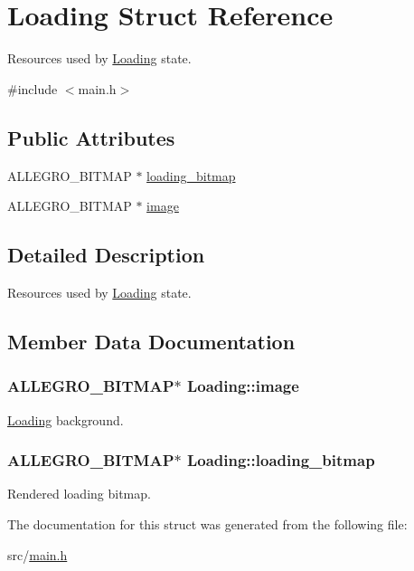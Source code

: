\hypertarget{structLoading}{\section{Loading Struct Reference}
\label{structLoading}
}


Resources used by \hyperlink{structLoading}{Loading} state.  




{\ttfamily \#include $<$main.\-h$>$}

\subsection*{Public Attributes}
\begin{DoxyCompactItemize}
\item 
A\-L\-L\-E\-G\-R\-O\-\_\-\-B\-I\-T\-M\-A\-P $\ast$ \hyperlink{structLoading_aa6c655f5a0c41583f9c1a547ca81b98b}{loading\-\_\-bitmap}
\item 
A\-L\-L\-E\-G\-R\-O\-\_\-\-B\-I\-T\-M\-A\-P $\ast$ \hyperlink{structLoading_a1d0c3f575a47ca8928fe0b5af85059c9}{image}
\end{DoxyCompactItemize}


\subsection{Detailed Description}
Resources used by \hyperlink{structLoading}{Loading} state. 

\subsection{Member Data Documentation}
\hypertarget{structLoading_a1d0c3f575a47ca8928fe0b5af85059c9}{
\subsubsection[{image}]{\setlength{\rightskip}{0pt plus 5cm}A\-L\-L\-E\-G\-R\-O\-\_\-\-B\-I\-T\-M\-A\-P$\ast$ Loading\-::image}}\label{structLoading_a1d0c3f575a47ca8928fe0b5af85059c9}
\hyperlink{structLoading}{Loading} background. \hypertarget{structLoading_aa6c655f5a0c41583f9c1a547ca81b98b}{
\subsubsection[{loading\-\_\-bitmap}]{\setlength{\rightskip}{0pt plus 5cm}A\-L\-L\-E\-G\-R\-O\-\_\-\-B\-I\-T\-M\-A\-P$\ast$ Loading\-::loading\-\_\-bitmap}}\label{structLoading_aa6c655f5a0c41583f9c1a547ca81b98b}
Rendered loading bitmap. 

The documentation for this struct was generated from the following file\-:\begin{DoxyCompactItemize}
\item 
src/\hyperlink{main_8h}{main.\-h}\end{DoxyCompactItemize}
